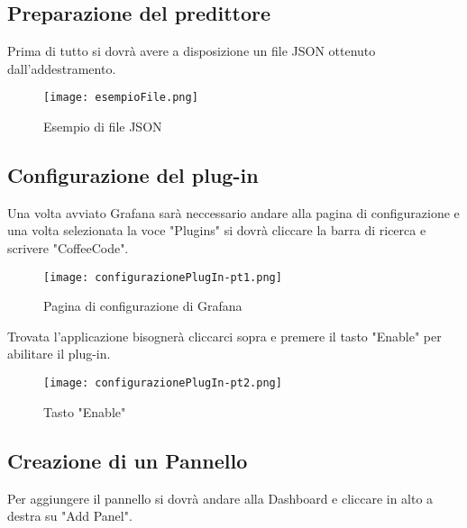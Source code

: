 \documentclass[../manuale-utente.tex]{subfiles}
\begin{document}
\subsection{Preparazione del predittore}
\label{subs:preparazione-del-predittore}
Prima di tutto si dovrà avere a disposizione un file JSON ottenuto dall'addestramento.

\begin{figure}[h!]
  \begin{center}
    \texttt{[image: esempioFile.png]}\\
    \caption{Esempio di file JSON}%
    \label{fig:esempio-filejson}
  \end{center}
\end{figure}

\subsection{Configurazione del plug-in}
\label{subs:configurazione-plug-in}
Una volta avviato Grafana sarà neccessario andare alla pagina di configurazione e una volta selezionata la voce "Plugins" si
dovrà cliccare la barra di ricerca e scrivere "CoffeeCode".

\begin{figure}[h!]
  \begin{center}
    \texttt{[image: configurazionePlugIn-pt1.png]}\\
    \caption{Pagina di configurazione di Grafana}%
    \label{fig:pagina-di-configurazione}
  \end{center}
\end{figure}

Trovata l'applicazione bisognerà cliccarci sopra e premere il tasto "Enable" per abilitare il plug-in.

\begin{figure}[h!]
  \begin{center}
    \texttt{[image: configurazionePlugIn-pt2.png]}\\
    \caption{Tasto "Enable"}%
    \label{fig:tasto-enable}
  \end{center}
\end{figure}

\newpage
\subsection{Creazione di un Pannello}
\label{subs:creazione-di-un-pannello}
Per aggiungere il pannello si dovrà andare alla Dashboard e cliccare in alto a destra su "Add Panel".
\end{document}
